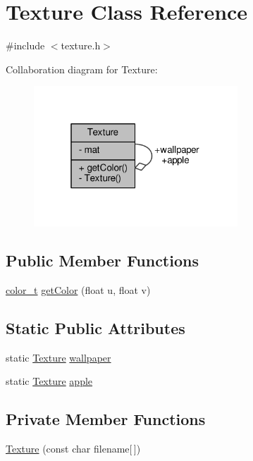 \hypertarget{classTexture}{}\section{Texture Class Reference}
\label{classTexture}


{\ttfamily \#include $<$texture.\+h$>$}



Collaboration diagram for Texture\+:
\nopagebreak
\begin{figure}[H]
\begin{center}
\leavevmode
\includegraphics[width=217pt]{classTexture__coll__graph}
\end{center}
\end{figure}
\subsection*{Public Member Functions}
\begin{DoxyCompactItemize}
\item 
\hyperlink{ray_8h_a8a2580fb65f7d3d4e24bdd412b9bd92d}{color\+\_\+t} \hyperlink{classTexture_a78e72a36da8f70603b2753b302c97330}{get\+Color} (float u, float v)
\end{DoxyCompactItemize}
\subsection*{Static Public Attributes}
\begin{DoxyCompactItemize}
\item 
static \hyperlink{classTexture}{Texture} \hyperlink{classTexture_a1fe6c8c86fe00b7f58d874c136b632ba}{wallpaper}
\item 
static \hyperlink{classTexture}{Texture} \hyperlink{classTexture_ae94748846788a55df372cc9152f829dd}{apple}
\end{DoxyCompactItemize}
\subsection*{Private Member Functions}
\begin{DoxyCompactItemize}
\item 
\hyperlink{classTexture_a8ad76d451ccb9732598137702887136b}{Texture} (const char filename\mbox{[}$\,$\mbox{]})
\end{DoxyCompactItemize}
